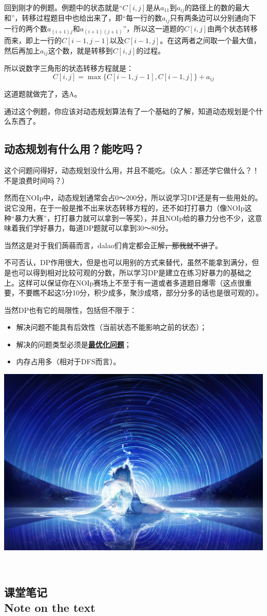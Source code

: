 \documentclass{article}
\theoremstyle{nonumberplain}
\newcommand{\note}{\ \par


	\subsection*{课堂笔记\\\tiny{Note on the text}}
	\newpage}
\begin{document}
回到刚才的例题。例题中的状态就是“$C[i,j]$是从$a_{11}$到$a_{ij}$的路径上的数的最大和”，转移过程题目中也给出来了，即“每一行的数$a_{ij}$只有两条边可以分别通向下一行的两个数$a_{(i+1)j}$和$a_{(i+1)(j+1)}$”，所以这一道题的$C[i,j]$由两个状态转移而来，即上一行的$C[i-1,j-1]$以及$C[i-1,j]$。在这两者之间取一个最大值，然后再加上$a_{ij}$这个数，就是转移到$C[i,j]$的过程。

所以说数字三角形的状态转移方程就是：
\begin{equation*}
	C[i,j]=\max\{C[i-1,j-1],C[i-1,j]\}+a_{ij}
\end{equation*}

这道题就做完了，选A。

通过这个例题，你应该对动态规划算法有了一个基础的了解，知道动态规划是个什么东西了。
\subsection{动态规划有什么用？能吃吗？}
这个问题问得好，动态规划没什么用，并且不能吃。（众人：那还学它做什么？！不是浪费时间吗？）

然而在NOIp中，动态规划通常会占0～200分，所以说学习DP还是有一些用处的。说它没用，在于一般是推不出来状态转移方程的，还不如打打暴力（像NOIp这种“暴力大赛”，打打暴力就可以拿到一等奖），并且NOIp给的暴力分也不少，这意味着我们学好暴力，每道DP题就可以拿到30～80分。

当然这是对于我们蒟蒻而言，dalao们肯定都会正解\sout{，那我就不讲了}。

不可否认，DP作用很大，但是也可以用别的方式来替代，虽然不能拿到满分，但是也可以得到相对比较可观的分数，所以学习DP是建立在练习好暴力的基础之上。这样可以保证你在NOIp赛场上不至于有一道或者多道题目爆零（这点很重要，不要瞧不起这5分10分，积少成多，聚沙成塔，部分分多的话也是很可观的）。

当然DP也有它的局限性，包括但不限于：
\begin{itemize}
	\item{解决问题不能具有后效性（当前状态不能影响之前的状态）；}
	\item{解决的问题类型必须是\textbf{\underline{最优化问题}}；}
	\item{内存占用多（相对于DFS而言）。}
\end{itemize}

\begin{center}\includegraphics[scale=0.60]{38183202_p0.jpg}\end{center}
\note
\end{document}
